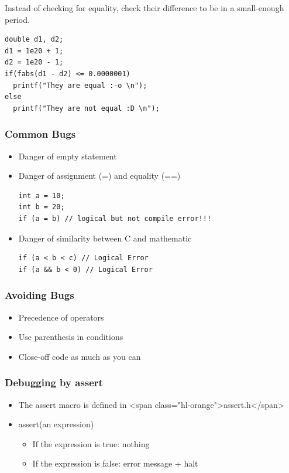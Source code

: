 \documentclass{../c-lecture}
\begin{document}
\begin{frame}[fragile]
  \begin{block}{}
    Instead of checking for equality, check their difference to be in a
    small-enough period.
  \end{block}
  \begin{verbatim}
double d1, d2;
d1 = 1e20 + 1;
d2 = 1e20 - 1;
if(fabs(d1 - d2) <= 0.0000001)
  printf("They are equal :-o \n");
else
  printf("They are not equal :D \n");
  \end{verbatim}
\end{frame}

\begin{frame}[fragile]
  \frametitle{Common Bugs}
  \begin{itemize}
    \item Danger of empty statement
    \item Danger of assignment (=) and equality (==)
    \begin{verbatim}
int a = 10;
int b = 20;
if (a = b) // logical but not compile error!!!
    \end{verbatim}
    \item Danger of similarity between C and mathematic
    \begin{verbatim}
if (a < b < c) // Logical Error
if (a && b < 0) // Logical Error
    \end{verbatim}
  \end{itemize}
\end{frame}

\begin{frame}
  \frametitle{Avoiding Bugs}
  \begin{itemize}
    \item Precedence of operators
    \item Use parenthesis in conditions
    \item Close-off code as much as you can
  \end{itemize}
\end{frame}

\begin{frame}
  \frametitle{Debugging by assert}
  \begin{itemize}
    \item
      The assert macro is defined in <span class="hl-orange">assert.h</span>

    \item assert(an expression)
    \begin{itemize}
      \item If the expression is true: nothing
      \item If the expression is false: error message + halt
    \end{itemize}
  \end{itemize}
\end{frame}
\end{document}
